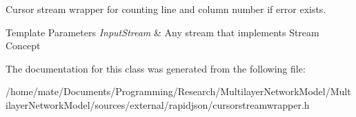 Cursor stream wrapper for counting line and column number if error exists. 


\begin{DoxyTemplParams}{Template Parameters}
{\em Input\+Stream} & Any stream that implements Stream Concept \\
\hline
\end{DoxyTemplParams}


The documentation for this class was generated from the following file\+:\begin{DoxyCompactItemize}
\item 
/home/mate/\+Documents/\+Programming/\+Research/\+Multilayer\+Network\+Model/\+Multilayer\+Network\+Model/sources/external/rapidjson/cursorstreamwrapper.\+h\end{DoxyCompactItemize}
